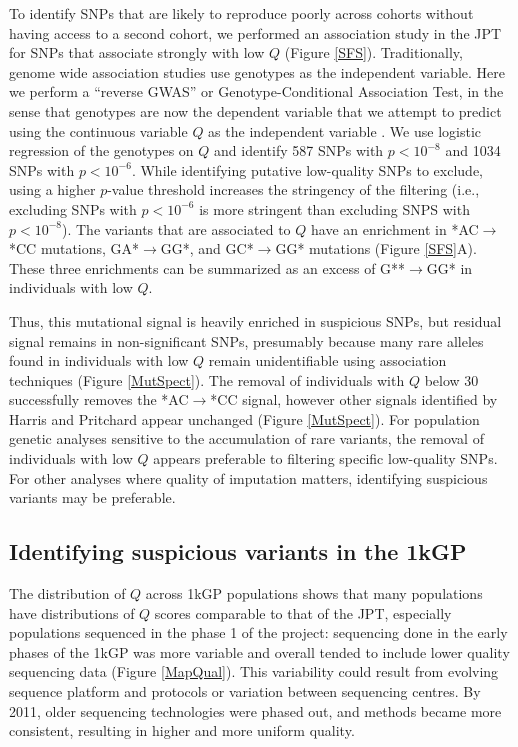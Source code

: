 \documentclass[9pt,lineno]{elife}
\begin{document}
To identify SNPs that are likely to reproduce poorly across cohorts without having access to a second cohort, we performed an association study in the JPT for SNPs that associate strongly with low $Q$ (Figure \ref{SFS}).
Traditionally, genome wide association studies use genotypes as the independent variable. 
Here we perform a ``reverse GWAS'' or Genotype-Conditional Association Test, in the sense that genotypes are now the dependent variable that we attempt to predict using the continuous variable $Q$ as the independent variable \citep{song2015testing}.
We use logistic regression of the genotypes on $Q$ and identify 587 SNPs with $p < 10^{-8}$ and 1034 SNPs with $ p < 10^{-6}$. 
While identifying putative low-quality SNPs to exclude, using a higher $p$-value threshold increases the stringency of the filtering (i.e., excluding SNPs with $ p < 10^{-6}$ is more stringent than excluding SNPS with $p < 10^{-8}$). 
The variants that are associated to $Q$ have an enrichment in *AC${\rightarrow}$*CC mutations, GA*${\rightarrow}$GG*, and GC*${\rightarrow}$GG* mutations (Figure \ref{SFS}A).
These three enrichments can be summarized as an excess of G**${\rightarrow}$GG* in individuals with low $Q$.

Thus, this mutational signal is heavily enriched in suspicious SNPs, but residual signal remains in non-significant SNPs, presumably because many rare alleles found in individuals with low $Q$ remain unidentifiable using association techniques (Figure \ref{MutSpect}). The removal of individuals with $Q$ below 30 successfully removes the *AC${\rightarrow}$*CC signal, however other signals identified by Harris and Pritchard appear unchanged (Figure \ref{MutSpect}).
For population genetic analyses sensitive to the accumulation of rare variants, the removal of individuals with low $Q$ appears preferable to filtering specific low-quality SNPs. 
For other analyses where quality of imputation matters, identifying suspicious variants may be preferable. 


\subsection{Identifying suspicious variants in the 1kGP}
The distribution of $Q$ across 1kGP populations shows that many populations have distributions of $Q$ scores comparable to that of the JPT, especially populations sequenced in the phase 1 of the project: sequencing done in the early phases of the 1kGP was more variable and overall tended to include lower quality sequencing data (Figure \ref{MapQual}).
This variability could result from evolving sequence platform and protocols or variation between sequencing centres. 
By 2011, older sequencing technologies were phased out, and methods became more consistent, resulting in higher and more uniform quality.
\end{document}
